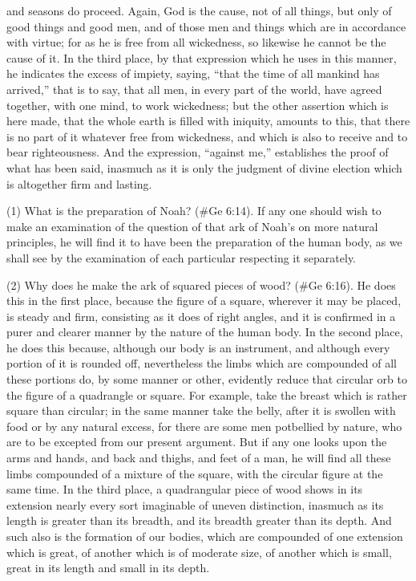 and seasons do proceed. Again, God is the cause, not of all things, but only of good things and
good men, and of those men and things which are in accordance with virtue; for as he is free from
all wickedness, so likewise he cannot be the cause of it. In the third place, by that expression which
he uses in this manner, he indicates the excess of impiety, saying, ``that the time of all mankind has
arrived,'' that is to say, that all men, in every part of the world, have agreed together, with one mind,
to work wickedness; but the other assertion which is here made, that the whole earth is filled with
iniquity, amounts to this, that there is no part of it whatever free from wickedness, and which is also
to receive and to bear righteousness. And the expression, ``against me,'' establishes the proof of
what has been said, inasmuch as it is only the judgment of divine election which is altogether firm
and lasting.


(1) What is the preparation of Noah? (\#Ge 6:14). If any one should wish to make an
examination of the question of that ark of Noah's on more natural principles, he will find it to have
been the preparation of the human body, as we shall see by the examination of each particular
respecting it separately.

(2) Why does he make the ark of squared pieces of wood? (\#Ge 6:16). He does this in the
first place, because the figure of a square, wherever it may be placed, is steady and firm,
consisting as it does of right angles, and it is confirmed in a purer and clearer manner by the
nature of the human body. In the second place, he does this because, although our body is an
instrument, and although every portion of it is rounded off, nevertheless the limbs which are
compounded of all these portions do, by some manner or other, evidently reduce that circular orb
to the figure of a quadrangle or square. For example, take the breast which is rather square than
circular; in the same manner take the belly, after it is swollen with food or by any natural excess, for
there are some men potbellied by nature, who are to be excepted from our present argument. But if
any one looks upon the arms and hands, and back and thighs, and feet of a man, he will find all
these limbs compounded of a mixture of the square, with the circular figure at the same time. In the
third place, a quadrangular piece of wood shows in its extension nearly every sort imaginable of
uneven distinction, inasmuch as its length is greater than its breadth, and its breadth greater than
its depth. And such also is the formation of our bodies, which are compounded of one extension
which is great, of another which is of moderate size, of another which is small, great in its length
and small in its depth.

